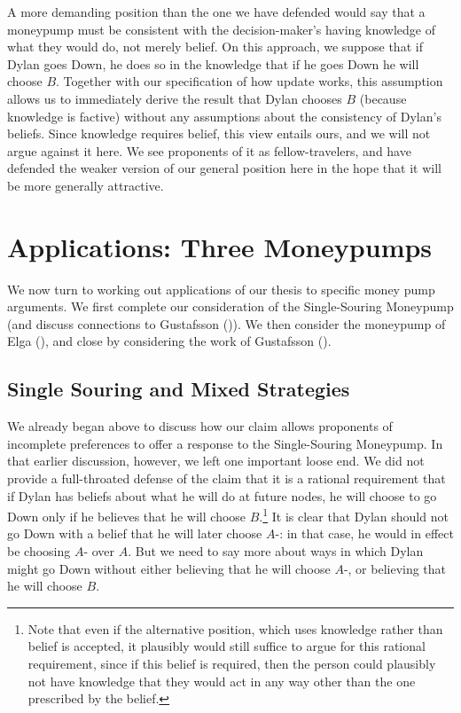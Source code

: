 \documentclass[
  11pt,
  letterpaper,
  DIV=11,
  numbers=noendperiod,
  twoside]{scrartcl}
\begin{document}
A more demanding position than the one we have defended would say that a
moneypump must be consistent with the decision-maker's having knowledge
of what they would do, not merely belief. On this approach, we suppose
that if Dylan goes Down, he does so in the knowledge that if he goes
Down he will choose \(B\). Together with our specification of how update
works, this assumption allows us to immediately derive the result that
Dylan chooses \(B\) (because knowledge is factive) without any
assumptions about the consistency of Dylan's beliefs. Since knowledge
requires belief, this view entails ours, and we will not argue against
it here. We see proponents of it as fellow-travelers, and have defended
the weaker version of our general position here in the hope that it will
be more generally attractive.

\section{Applications: Three
Moneypumps}\label{applications-three-moneypumps}

We now turn to working out applications of our thesis to specific money
pump arguments. We first complete our consideration of the
Single-Souring Moneypump (and discuss connections to Gustafsson
()). We then consider the moneypump
of Elga (), and close by considering the
work of Gustafsson ().

\subsection{Single Souring and Mixed
Strategies}\label{single-souring-and-mixed-strategies}

We already began above to discuss how our claim allows proponents of
incomplete preferences to offer a response to the Single-Souring
Moneypump. In that earlier discussion, however, we left one important
loose end. We did not provide a full-throated defense of the claim that
it is a rational requirement that if Dylan has beliefs about what he
will do at future nodes, he will choose to go Down only if he believes
that he will choose \(B\).\footnote{Note that even if the alternative
  position, which uses knowledge rather than belief is accepted, it
  plausibly would still suffice to argue for this rational requirement,
  since if this belief is required, then the person could plausibly not
  have knowledge that they would act in any way other than the one
  prescribed by the belief.} It is clear that Dylan should not go Down
with a belief that he will later choose \(A\)-: in that case, he would
in effect be choosing \(A\)- over \(A\). But we need to say more about
ways in which Dylan might go Down without either believing that he will
choose \(A\)-, or believing that he will choose \(B\).
\end{document}
